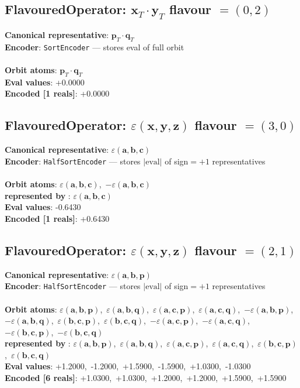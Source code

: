 \documentclass[a4paper,11pt]{article}
\newcommand{\fpbeomcfokjooi}[2]{\mathbf{#1}_T \cdot \mathbf{#2}_T}
\newcommand{\kblbmcpggoncpf}[3]{\varepsilon(\mathbf{#1},\mathbf{#2},\mathbf{#3})}
\begin{document}
\subsection{FlavouredOperator: $\fpbeomcfokjooi{x}{y}$  flavour $= (0, 2)$}
\textbf{  Canonical representative}: $\displaystyle\fpbeomcfokjooi{p}{q}$\\
\textbf{  Encoder}: \texttt{SortEncoder} — stores eval of full orbit\\\\
\textbf{  Orbit atoms}: $\fpbeomcfokjooi{p}{q}$\\
\textbf{  Eval values}: +0.0000\\
\textbf{  Encoded [1 reals]}: +0.0000\\

\subsection{FlavouredOperator: $\kblbmcpggoncpf{x}{y}{z}$  flavour $= (3, 0)$}
\textbf{  Canonical representative}: $\displaystyle\kblbmcpggoncpf{a}{b}{c}$\\
\textbf{  Encoder}: \texttt{HalfSortEncoder} — stores $|\text{eval}|$ of sign$=+1$ representatives\\\\
\textbf{  Orbit atoms}: $\kblbmcpggoncpf{a}{b}{c}$,\ $-\kblbmcpggoncpf{a}{b}{c}$\\
\textbf{  represented by }: $\kblbmcpggoncpf{a}{b}{c}$\\
\textbf{  Eval values}: -0.6430\\
\textbf{  Encoded [1 reals]}: +0.6430\\

\subsection{FlavouredOperator: $\kblbmcpggoncpf{x}{y}{z}$  flavour $= (2, 1)$}
\textbf{  Canonical representative}: $\displaystyle\kblbmcpggoncpf{a}{b}{p}$\\
\textbf{  Encoder}: \texttt{HalfSortEncoder} — stores $|\text{eval}|$ of sign$=+1$ representatives\\\\
\textbf{  Orbit atoms}: $\kblbmcpggoncpf{a}{b}{p}$,\ $\kblbmcpggoncpf{a}{b}{q}$,\ $\kblbmcpggoncpf{a}{c}{p}$,\ $\kblbmcpggoncpf{a}{c}{q}$,\ $-\kblbmcpggoncpf{a}{b}{p}$,\ $-\kblbmcpggoncpf{a}{b}{q}$,\ $\kblbmcpggoncpf{b}{c}{p}$,\ $\kblbmcpggoncpf{b}{c}{q}$,\ $-\kblbmcpggoncpf{a}{c}{p}$,\ $-\kblbmcpggoncpf{a}{c}{q}$,\ $-\kblbmcpggoncpf{b}{c}{p}$,\ $-\kblbmcpggoncpf{b}{c}{q}$\\
\textbf{  represented by }: $\kblbmcpggoncpf{a}{b}{p}$,\ $\kblbmcpggoncpf{a}{b}{q}$,\ $\kblbmcpggoncpf{a}{c}{p}$,\ $\kblbmcpggoncpf{a}{c}{q}$,\ $\kblbmcpggoncpf{b}{c}{p}$,\ $\kblbmcpggoncpf{b}{c}{q}$\\
\textbf{  Eval values}: +1.2000,\ -1.2000,\ +1.5900,\ -1.5900,\ +1.0300,\ -1.0300\\
\textbf{  Encoded [6 reals]}: +1.0300,\ +1.0300,\ +1.2000,\ +1.2000,\ +1.5900,\ +1.5900\\
\end{document}
